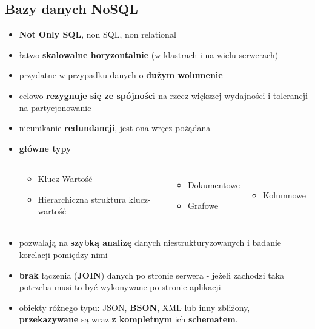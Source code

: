 \documentclass[a4paper]{article}
\begin{document}
    \subsection{Bazy danych NoSQL}
    \begin{itemize}[noitemsep]
        \item \textbf{Not Only SQL}, non SQL, non relational
        \item łatwo \textbf{skalowalne horyzontalnie} (w klastrach i na wielu serwerach)
        \item przydatne w przypadku danych o \textbf{dużym wolumenie}
        \item celowo \textbf{rezygnuje się ze spójności} na rzecz większej wydajności i tolerancji na partycjonowanie
        \item nieunikanie \textbf{redundancji}, jest ona wręcz pożądana
        \item \textbf{główne typy}
        \begin{table}[H]
            \begin{center}
                \begin{tabular}{p{7cm} p{4cm} p{5cm}}
                    \begin{itemize}[noitemsep]
                        \item Klucz-Wartość
                        \item Hierarchiczna struktura klucz-wartość
                    \end{itemize}
                    &
                    \begin{itemize}[noitemsep]
                        \item Dokumentowe
                        \item Grafowe
                    \end{itemize}
                    &
                    \begin{itemize}[noitemsep]
                        \item Kolumnowe
                    \end{itemize}
                \end{tabular}
            \end{center}
        \end{table}
        \item pozwalają na \textbf{szybką analizę} danych niestrukturyzowanych i badanie korelacji pomiędzy nimi
        \item \textbf{brak} łączenia (\textbf{JOIN}) danych po stronie serwera - jeżeli zachodzi taka potrzeba musi
        to być wykonywane po stronie aplikacji
        \item obiekty różnego typu: JSON, \textbf{BSON}, XML lub inny zbliżony, \textbf{przekazywane} są wraz \textbf{z
        kompletnym} ich \textbf{schematem}.
    \end{itemize}
\end{document}
